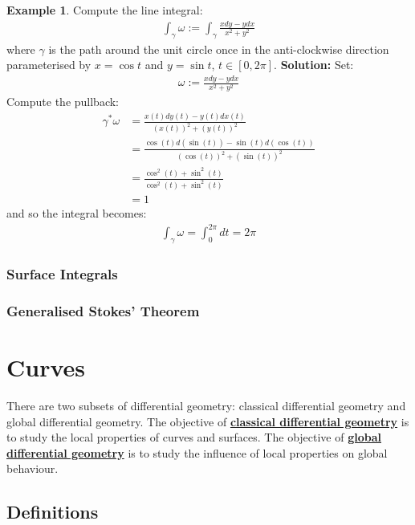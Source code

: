 \documentclass[11pt]{scrartcl}
\theoremstyle{definition}
\newtheorem{ex}{Example}
\theoremstyle{remark}
\newcommand{\dfn}[1]{\textbf{\underline{#1}}}
\newcommand{\idx}[2]{\int_{#1}^{#2}}
\begin{document}
{\begin{ex}
	Compute the line integral: 
	\begin{align*}
		\idx{\gamma}{} \omega := \idx{\gamma}{} \frac{xdy - ydx}{x^2 + y^2}
	\end{align*}
	where $\gamma$ is the path around the unit circle once in the anti-clockwise direction parameterised by $x = \cos t$ and $ y = \sin t$, $t \in [0, 2 \pi ]$. 
	\newline
	\newline
	\textbf{Solution:} Set: 
	\begin{align*}
		\omega := \frac{xdy - ydx}{x^2 + y^2}
	\end{align*}
	Compute the pullback: 
	\begin{align*}
		\gamma^* \omega & = \frac{x(t) dy(t) - y(t) dx(t)}{(x(t))^2 + (y(t))^2} \\
		& = \frac{\cos (t) d ( \sin(t)) - \sin (t) d ( \cos(t)) }{( \cos(t))^2 + ( \sin(t))^2} \\
		& = \frac{\cos^2(t) + \sin^2(t)}{\cos^2(t) + \sin^2(t)} \\
		& = 1
	\end{align*}
	and so the integral becomes: 
	\begin{align*}
		\idx{\gamma}{} \omega = \idx{0}{2 \pi} dt = 2 \pi 
	\end{align*}
\end{ex}

\subsubsection{Surface Integrals}
\subsubsection{Generalised Stokes' Theorem}

\section{Curves}
There are two subsets of differential geometry: classical differential geometry and global differential geometry. The objective of \dfn{classical differential geometry} is to study the local properties of curves and surfaces. The objective of \dfn{global differential geometry} is to study the influence of local properties on global behaviour. 
\subsection{Definitions}

}
\end{document}
